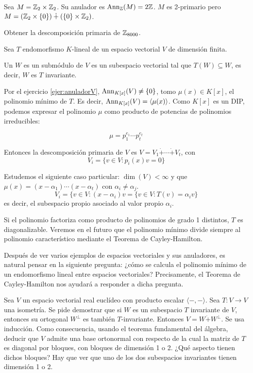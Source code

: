 \begin{ejemplo}
  Sea \(M = \mathbb{Z}_2 \times \mathbb{Z}_2\). Su anulador es \(\operatorname{Ann}_{\mathbb{Z}}(M) = 2\mathbb{Z}\). \(M\) es 2-primario
  pero \(M = (\mathbb{Z}_2 \times \{0\}) \dotplus (\{0\} \times \mathbb{Z}_2)\).
\end{ejemplo}

\begin{ejercicio}
  Obtener la descomposición primaria de \(\mathbb{Z}_{8000}\).
\end{ejercicio}

\begin{ejemplo}
  Sea \(T\) endomorfismo \(K\)-lineal de un espacio vectorial \(V\) de dimensión finita.

  Un \(W\) es un submódulo de \(V\) es un subespacio vectorial tal que
  \(T(W)\subseteq W\), es decir, \(W\) es \(T\) invariante.

  Por el ejercicio \ref{ejer:anuladorV}, \(\operatorname{Ann}_{K[x]}(V)\neq\{0\}\),
  tomo \(\mu(x)\in K[x]\), el polinomio
  mínimo de \(T\). Es decir, \(\operatorname{Ann}_{K[x]}(V)=\langle\mu(x)\rangle\). Como \(K[x]\) es
  un DIP, podemos expresar el polinomio \(\mu\) como producto de potencias de polinomios
  irreducibles:

  \[
    \mu=p_1^{e_1}\cdots p_t^{e_t}
  \]

  Entonces la descomposición primaria de \(V\) es \(V=V_1\dot{+}
  \cdots\dot{+}V_t\), con
  \[
    V_i=\{v\in V:p_i(x)v=0\}
  \]

  Estudemos el siguiente caso particular: \(\dim(V)<\infty\) y que
  \(\mu(x)=(x-\alpha_1) \cdots (x-\alpha_t)\) con \(\alpha_i\neq\alpha_j\).
  \[
    V_i=\{v\in V:(x-\alpha_i)v=\{v\in V:T(v)=\alpha_i v\}
  \]
  es decir, el subespacio propio asociado al valor propio \(\alpha_i\).

  Si el polinomio factoriza como producto de polinomios de grado 1 distintos,
  \(T\) es diagonalizable.
  Veremos en el futuro que el polinomio mínimo divide siempre al polinomio
  característico mediante el Teorema de Cayley-Hamilton.
\end{ejemplo}

Después de ver varios ejemplos de espacios vectoriales y sus anuladores, es natural
pensar en la siguiente pregunta: ¿cómo se calcula el polinomio mínimo de un
endomorfismo lineal entre espacios vectoriales? Precisamente, el Teorema de
Cayley-Hamilton nos ayudará a responder a dicha pregunta.

\begin{ejercicio}
  Sea \(V\) un espacio vectorial real euclídeo con producto
  escalar \(\langle -, - \rangle\). Sea \(T: V \longrightarrow V\) una isometría.
  Se pide demostrar que si \(W\) es un subespacio \(T\) invariante de \(V\),
  entonces su ortogonal \(W^\perp\) es también \(T\)-invariante.
  Entonces \(V=W\dot{+}W^\perp\). Se usa inducción. Como consecuencia, usando
  el teorema fundamental del álgebra, deducir que \(V\) admite una base
  ortonormal con respecto de la cual la matriz de \(T\) es diagonal por
  bloques, con bloques de dimensión 1 o 2. ¿Qué aspecto tienen dichos
  bloques? Hay que ver que uno de los dos subespacios invariantes tienen
  dimensión 1 o 2.
\end{ejercicio}
